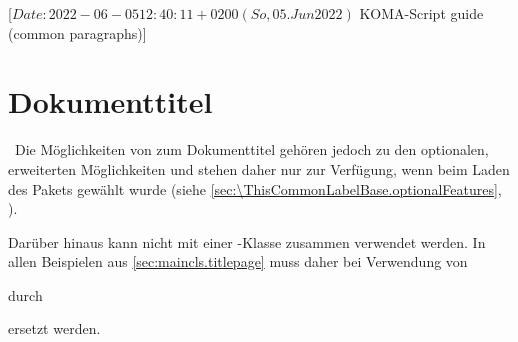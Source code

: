 %
%
%
%
%
%
%

                 [$Date: 2022-06-05 12:40:11 +0200 (So, 05. Jun 2022) $
                  KOMA-Script guide (common paragraphs)]

\section{Dokumenttitel}
%
\BeginIndexGroup
{}%

%
\IfThisCommonLabelBase{scrextend}{\iftrue}{\csname iffalse\endcsname}%
  \ Die Möglichkeiten von  zum
  Dokumenttitel gehören jedoch zu den optionalen, erweiterten Möglichkeiten
  und stehen daher nur zur Verfügung, wenn beim Laden des Pakets
   gewählt
  wurde (siehe \autoref{sec:\ThisCommonLabelBase.optionalFeatures},
  ).

  Darüber hinaus kann  nicht mit einer \KOMAScript-Klasse
  zusammen verwendet werden. In allen Beispielen aus
  \autoref{sec:maincls.titlepage} muss daher bei Verwendung von
durch
  ersetzt werden.
\fi

